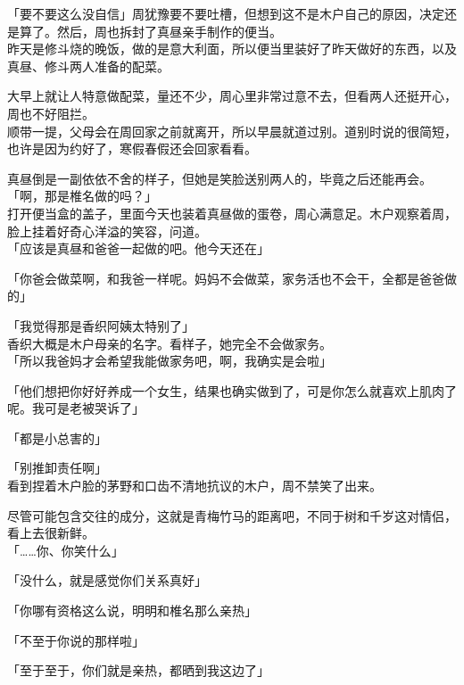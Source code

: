 「要不要这么没自信」周犹豫要不要吐槽，但想到这不是木户自己的原因，决定还是算了。然后，周也拆封了真昼亲手制作的便当。\\

昨天是修斗烧的晚饭，做的是意大利面，所以便当里装好了昨天做好的东西，以及真昼、修斗两人准备的配菜。

大早上就让人特意做配菜，量还不少，周心里非常过意不去，但看两人还挺开心，周也不好阻拦。\\

顺带一提，父母会在周回家之前就离开，所以早晨就道过别。道别时说的很简短，也许是因为约好了，寒假春假还会回家看看。

真昼倒是一副依依不舍的样子，但她是笑脸送别两人的，毕竟之后还能再会。\\

「啊，那是椎名做的吗？」\\

打开便当盒的盖子，里面今天也装着真昼做的蛋卷，周心满意足。木户观察着周，脸上挂着好奇心洋溢的笑容，问道。\\

「应该是真昼和爸爸一起做的吧。他今天还在」

「你爸会做菜啊，和我爸一样呢。妈妈不会做菜，家务活也不会干，全都是爸爸做的」

「我觉得那是香织阿姨太特别了」\\

香织大概是木户母亲的名字。看样子，她完全不会做家务。\\

「所以我爸妈才会希望我能做家务吧，啊，我确实是会啦」

「他们想把你好好养成一个女生，结果也确实做到了，可是你怎么就喜欢上肌肉了呢。我可是老被哭诉了」

「都是小总害的」

「别推卸责任啊」\\

看到捏着木户脸的茅野和口齿不清地抗议的木户，周不禁笑了出来。

尽管可能包含交往的成分，这就是青梅竹马的距离吧，不同于树和千岁这对情侣，看上去很新鲜。\\

「……你、你笑什么」

「没什么，就是感觉你们关系真好」

「你哪有资格这么说，明明和椎名那么亲热」

「不至于你说的那样啦」

「至于至于，你们就是亲热，都晒到我这边了」\\

